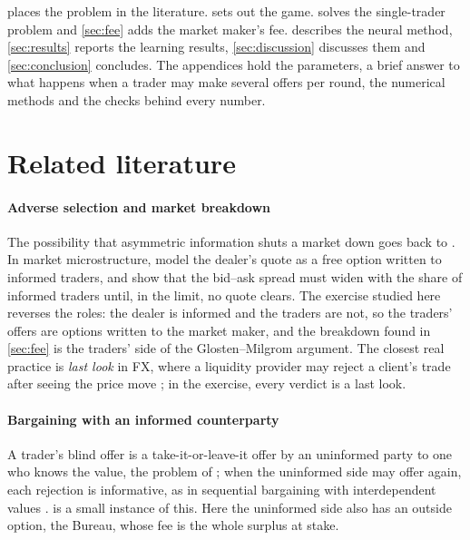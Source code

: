 \documentclass[11pt,a4paper]{article}
\theoremstyle{plain}
\theoremstyle{definition}
\newcommand{\1}{\mathbf{1}}
\begin{document}
 places the problem in the literature.  sets out the game.  solves the single-trader problem and \cref{sec:fee} adds the market maker's fee.  describes the neural method, \cref{sec:results} reports the learning results, \cref{sec:discussion} discusses them and \cref{sec:conclusion} concludes. The appendices hold the parameters, a brief answer to what happens when a trader may make several offers per round, the numerical methods and the checks behind every number.

\section{Related literature}\label{sec:literature}

\paragraph{Adverse selection and market breakdown}
The possibility that asymmetric information shuts a market down goes back to \citet{akerlof1970}. In market microstructure, \citet{copeland1983} model the dealer's quote as a free option written to informed traders, and \citet{glosten1985} show that the bid--ask spread must widen with the share of informed traders until, in the limit, no quote clears. The exercise studied here reverses the roles: the dealer is informed and the traders are not, so the traders' offers are options written to the market maker, and the breakdown found in \cref{sec:fee} is the traders' side of the Glosten--Milgrom argument. The closest real practice is \emph{last look} in FX, where a liquidity provider may reject a client's trade after seeing the price move \citep{oomen2017}; in the exercise, every verdict is a last look.

\paragraph{Bargaining with an informed counterparty}
A trader's blind offer is a take-it-or-leave-it offer by an uninformed party to one who knows the value, the problem of \citet{samuelson1984}; when the uninformed side may offer again, each rejection is informative, as in sequential bargaining with interdependent values \citep{deneckere2006}.  is a small instance of this. Here the uninformed side also has an outside option, the Bureau, whose fee is the whole surplus at stake.
\end{document}
